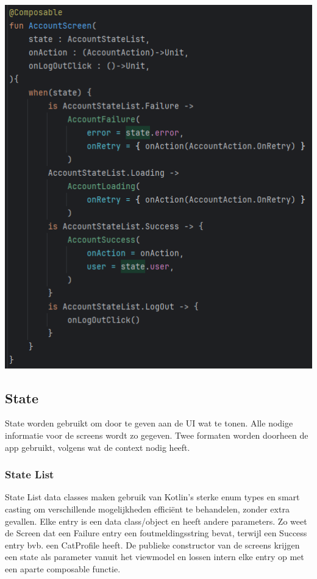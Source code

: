 \documentclass{report}
\begin{document}
\begin{center}
    \includegraphics{Screen_state}
\end{center}

\subsection{State}
State worden gebruikt om door te geven aan de UI wat te tonen. Alle nodige informatie voor de screens wordt zo gegeven.
Twee formaten worden doorheen de app gebruikt, volgens wat de context nodig heeft.

\subsubsection{State List}
State List data classes maken gebruik van Kotlin's sterke enum types en smart casting om verschillende mogelijkheden efficiënt te behandelen, zonder extra gevallen.
Elke entry is een data class/object en heeft andere parameters. Zo weet de Screen dat een Failure entry een foutmeldingsstring bevat, terwijl een Success entry bvb. een CatProfile heeft.
De publieke constructor van de screens krijgen een state als parameter vanuit het viewmodel en lossen intern elke entry op met een aparte composable functie.
\end{document}
